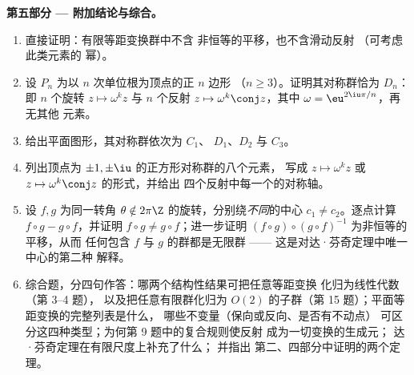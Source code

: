 \begin{problem}
\medskip
\noindent\textbf{第五部分 --- 附加结论与综合。}
\begin{enumerate}[resume]
  \item 直接证明：有限等距变换群中不含
        非恒等的平移，也不含滑动反射
        （可考虑此类元素的
        幂）。
  \item 设 $P_n$ 为以 $n$ 次单位根为顶点的正 $n$ 边形
        （$n \geq 3$）。证明其对称群恰为 $D_n$：
        即 $n$ 个旋转 $z
        \mapsto \omega^k z$ 与 $n$ 个反射 $z \mapsto
        \omega^k \conj z$，其中 $\omega = \eu^{2\iu\pi/n}$，再无其他
        元素。
  \item 给出平面图形，其对称群依次为 $C_1$、
        $D_1$、$D_2$ 与 $C_3$。
  \item 列出顶点为 $\pm1, \pm\iu$ 的正方形对称群的八个元素，
        写成 $z \mapsto
        \omega^k z$ 或 $z \mapsto \omega^k\conj z$ 的形式，并给出
        四个反射中每一个的对称轴。
  \item 设 $f, g$ 为同一转角 $\theta
        \notin 2\pi\Z$ 的旋转，分别绕\emph{不同}的中心 $c_1 \neq
        c_2$。逐点计算 $f\circ g - g\circ f$，并证明
        $f\circ g \neq g\circ f$；进一步证明 $(f \circ
        g)\circ(g\circ f)^{-1}$ 为非恒等的平移，从而
        任何包含 $f$ 与 $g$ 的群都是无限群 ——
        这是对达·芬奇定理中唯一中心的第二种
        解释。
  \item 综合题，分四句作答：哪两个结构性结果可把任意等距变换
        化归为线性代数（第 3--4 题），
        以及把任意有限群化归为
        $O(2)$ 的子群（第 15 题）；平面等距变换的完整列表是什么，
        哪些不变量（保向或反向、是否有不动点）
        可区分这四种类型；为何第 9 题中的复合规则使反射
        成为一切变换的生成元；
        达·芬奇定理在有限尺度上补充了什么；
        并指出
        第二、四部分中证明的两个定理。
\end{enumerate}
\end{problem}
